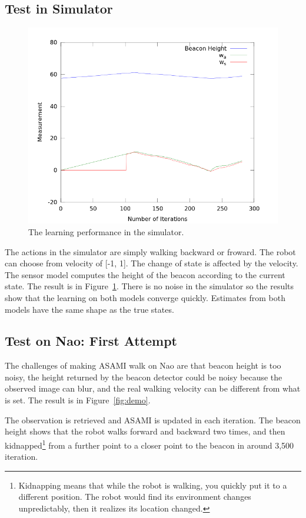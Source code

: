 \documentclass[12pt]{article}
\begin{document}
\subsection{Test in Simulator}

\begin{figure}
\centering
\includegraphics[width=0.7\columnwidth]{simResult.png}
\caption{The learning performance in the simulator.}
\label{fig:sim}
\end{figure}

The actions in the simulator are simply walking backward or froward.
The robot can choose from velocity of [-1, 1]. The change of state is
affected by the velocity.
The sensor model computes the height of the beacon according to the
current state. The result is in Figure~\ref{fig:sim}. There is no
noise in the simulator so the results show that the learning on both
models converge quickly. Estimates from both models have the same
shape as the true states.

\subsection{Test on Nao: First Attempt}
\label{nao:1st}

The challenges of making ASAMI walk on Nao are that beacon height is
too noisy, the height returned by the beacon detector could be noisy
because the observed image can blur, and the real walking velocity can
be different from what is set. The result is in Figure~\ref{fig:demo}.

The observation is retrieved and ASAMI is updated in each iteration.
The beacon height shows that the robot walks forward and backward two
times, and then kidnapped\footnote{Kidnapping means that while the robot
is walking, you quickly put it to a different position. The robot
would find its environment changes unpredictably, then it realizes its
location changed.} from a further point to a closer point to
the beacon in around 3,500 iteration.
\end{document}
